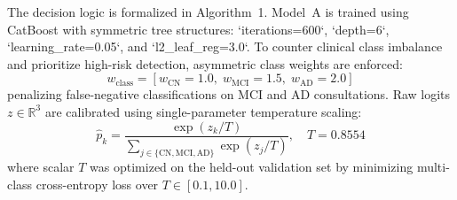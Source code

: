 \documentclass[11pt,a4paper]{article}
\begin{document}
The decision logic is formalized in Algorithm~1. Model~A is trained using CatBoost with symmetric tree structures: `iterations=600`, `depth=6`, `learning_rate=0.05`, and `l2_leaf_reg=3.0`. To counter clinical class imbalance and prioritize high-risk detection, asymmetric class weights are enforced:
\begin{equation}
    w_{\text{class}} = [w_{\text{CN}} = 1.0, \; w_{\text{MCI}} = 1.5, \; w_{\text{AD}} = 2.0]
    \label{eq:class_weights}
\end{equation}
penalizing false-negative classifications on MCI and AD consultations. Raw logits $z \in \mathbb{R}^3$ are calibrated using single-parameter temperature scaling:
\begin{equation}
    \hat{p}_k = \frac{\exp(z_k / T)}{\sum_{j \in \{\text{CN}, \text{MCI}, \text{AD}\}} \exp(z_j / T)}, \quad T = 0.8554
    \label{eq:temperature_scaling}
\end{equation}
where scalar $T$ was optimized on the held-out validation set by minimizing multi-class cross-entropy loss over $T \in [0.1, 10.0]$.
\end{document}
